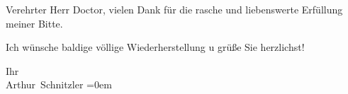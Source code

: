 \pstart{}Verehrter Herr Doctor,\pend\vspace{0.5em}
\pstart
           vielen Dank für die rasche und liebenswerte Erfüllung meiner Bitte.\pend
           
\pstart
           Ich wünsche baldige völlige Wiederherstellung u grüße Sie herzlichst!\pend
           
\pstart
           Ihr{\\[\baselineskip]}\spacefill\mbox{Arthur Schnitzler}\pend
           \leftskip=0em{}\endnumbering{}  \newcommand{\dateiname}{L02351}\newcommand{\titel}{Arthur Schnitzler an Robert Adam, 20. 7. 192[0]}\newcommand{\editorInnen}{Martin Anton Müller und Gerd-Hermann Susen}
